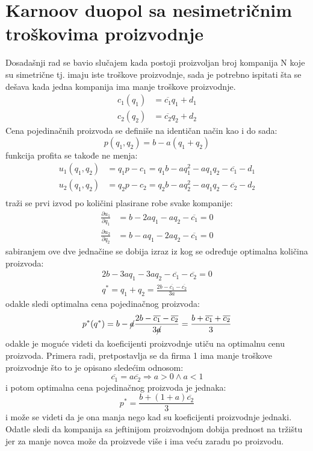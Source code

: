 \documentclass[12pt]{article}
\begin{document}
\section{Karnoov duopol sa nesimetričnim troškovima proizvodnje}
\par Dosadašnji rad se bavio slučajem kada postoji proizvoljan broj kompanija
N koje su simetrične tj. imaju iste troškove proizvodnje, sada je potrebno
ispitati šta se dešava kada jedna kompanija ima manje troškove proizvodnje.
\begin{align*}
	c_1 (q_1) &= \overline{c_1} q_1 + d_1 \\
	c_2 (q_2) &= \overline{c_2} q_2 + d_2
\end{align*}
Cena pojedinačnih proizvoda se definiše na identičan način kao i do sada:
\begin{equation*}
	p(q_1, q_2) = b - a (q_1 + q_2)
\end{equation*}
funkcija profita se takođe ne menja:
\begin{align*}
	u_1(q_1, q_2) &= q_1 p - c_1 = q_1 b - a q_1^2 - a q_1 q_2 - \overline{c_1}
	- d_1\\
	u_2(q_1, q_2) &= q_2 p - c_2 = q_2 b - a q_2^2 - a q_1 q_2 - \overline{c_2}
	- d_2\\
\end{align*}
traži se prvi izvod po količini plasirane robe svake kompanije:
\begin{align*}
	\frac{\partial u_1}{\partial q_1} &= b - 2 a q_1 - a q_2 - \overline{c_1} = 0
	\\
	\frac{\partial u_2}{\partial q_2} &= b - a q_1 - 2 a q_2 - \overline{c_1} = 0
\end{align*}
sabiranjem ove dve jednačine se dobija izraz iz kog se određuje optimalna
količina proizvoda:
\begin{gather*}
	2 b - 3 a q_1 - 3 a q_2 - \overline{c_1} - \overline{c_2} = 0 \\
	q^* = q_1 + q_2 = \frac{2 b - \overline{c_1} - \overline{c_2}}{3 a}
\end{gather*}
odakle sledi optimalna cena pojedinačnog proizvoda:
\begin{equation*}
	p^*(q^*) = b
	- \cancel{a} \frac{2 b - \overline{c_1} - \overline{c_2}}{3 \cancel{a}}
	= \frac{b + \overline{c_1} + \overline{c_2}}{3}
\end{equation*}
odakle je moguće videti da koeficijenti proizvodnje utiču na optimalnu cenu
proizvoda. Primera radi, pretpostavlja se da firma 1 ima manje troškove
proizvodnje što to je opisano sledećim odnosom:
\begin{equation*}
	\overline{c_1} = a \overline{c_2} \Rightarrow a > 0 \land a < 1
\end{equation*}
i potom optimalna cena pojedinačnog proizvoda je jednaka:
\begin{equation*}
	p^* = \frac{b + (1+a) \overline{c_2}}{3}
\end{equation*}
i može se videti da je ona manja nego kad su koeficijenti proizvodnje jednaki.
Odatle sledi da kompanija sa jeftinijom proizvodnjom dobija prednost na tržištu
jer za manje novca može da proizvede više i ima veću zaradu po proizvodu.
\end{document}
